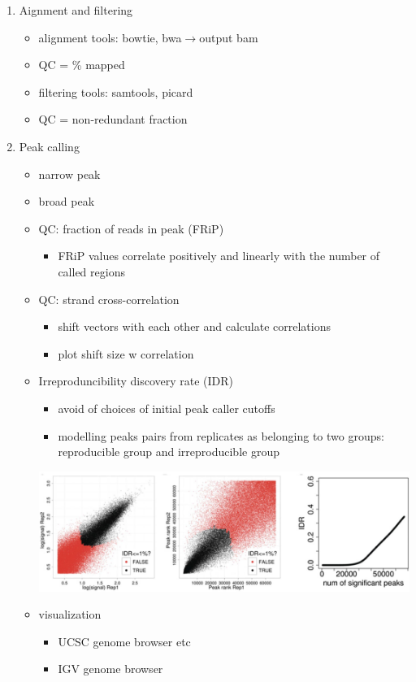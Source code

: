 \documentclass[font=12pt]{article}
\begin{document}
\begin{itemize}
\begin{enumerate}
		\item Aignment and filtering
		\begin{itemize}
			\item alignment tools: bowtie, bwa$\to$output bam
			\item QC = \% mapped
			\item filtering tools: samtools, picard
			\item QC = non-redundant fraction
		\end{itemize}
		\item Peak calling
		\begin{itemize}
			\item narrow peak
			\item broad peak
			\item QC: fraction of reads in peak (FRiP)
			\begin{itemize}
				\item FRiP values correlate positively and linearly with the number of called regions
			\end{itemize}
			\item QC: strand cross-correlation
			\begin{itemize}
				\item shift vectors with each other and calculate correlations
				\item plot shift size w correlation
			\end{itemize}
			\item Irreproduncibility discovery rate (IDR)
			\begin{itemize}
				\item avoid of choices of initial peak caller cutoffs
				\item modelling peaks pairs from replicates as belonging to two groups: reproducible group and irreproducible group
			\end{itemize}
			\includegraphics[width=\linewidth]{IDR}
			\item visualization
			\begin{itemize}
				\item UCSC genome browser etc
				\item IGV genome browser
			\end{itemize}
		\end{itemize}
	\end{enumerate}
\end{itemize}
\end{document}
